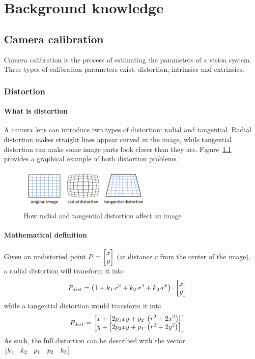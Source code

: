 \chapter{Background knowledge}
\label{chap:background}

\section{Camera calibration}

Camera calibration is the process of estimating the parameters of a vision system.
Three types of calibration parameters exist: distortion, intrinsics and extrinsics.

\subsection[Distortion]{Distortion~\cite{calib-dist}}

\subsubsection{What is distortion}

A camera lens can introduce two types of distortion: radial and tangential.
Radial distortion makes straight lines appear curved in the image, while tangential distortion can make some image parts look closer than they are.
Figure~\ref{fig:distortion} provides a graphical example of both distortion problems.

\begin{figure}
	\centerline{\includegraphics[width=0.6\textwidth]{images/distortion.png}}
	\caption{\centering How radial and tangential distortion affect an image}
	\label{fig:distortion}
\end{figure}

\subsubsection{Mathematical definition}

Given an undistorted point $P=\begin{bmatrix} x \\ y \end{bmatrix}$ (at distance $r$ from the center of the image), a radial distortion will transform it into
\begin{equation}
	P_{dist} = \left( 1 + k_1{\cdot}r^2 + k_2{\cdot}r^4 + k_3{\cdot}r^6 \right) \cdot \begin{bmatrix} x \\ y \end{bmatrix}
\end{equation}
while a tangential distortion would transform it into
\begin{equation}
	P_{dist} = \begin{bmatrix} x+\left[ 2p_1xy + p_2{\cdot}\left( r^2+2x^2 \right) \right] \\ y+\left[ 2p_2xy + p_1{\cdot}\left( r^2+2y^2 \right) \right] \end{bmatrix}
\end{equation}
As such, the full distortion can be described with the vector $\begin{bmatrix} k_1 & k_2 & p_1 & p_2 & k_3 \end{bmatrix}$

